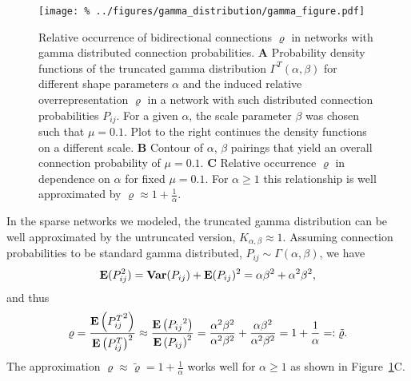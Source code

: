 \begin{figure}[h!]
\centering
\texttt{[image: \%
  ../figures/gamma\_distribution/gamma\_figure.pdf]}
\caption{Relative occurrence of bidirectional connections $\varrho$ in
  networks with gamma distributed connection probabilities. \textbf{A}
  Probability density functions of the truncated gamma distribution
  $\Gamma^T(\alpha,\beta)$ for different shape parameters $\alpha$ and
  the induced relative overrepresentation $\varrho$ in a network with
  such distributed connection probabilities $P_{ij}$. For a given
  $\alpha$, the scale parameter $\beta$ was chosen such that $\mu =
  0.1$. Plot to the right continues the density functions on a
  different scale. \textbf{B} Contour of $\alpha$, $\beta$ pairings
  that yield an overall connection probability of $\mu =
  0.1$. \textbf{C} Relative occurrence $\varrho$ in dependence on
  $\alpha$ for fixed $\mu = 0.1$. For $\alpha \geq 1$ this
  relationship is well approximated by $\varrho \approx 1 +
  \frac{1}{\alpha}$.}
\label{fig:gd}
\end{figure}
\vspace{0.2cm}

In the sparse networks we modeled, the truncated gamma distribution
can be well approximated by the untruncated version, $K_{\alpha,
  \beta} \approx 1$. Assuming connection probabilities to be standard
gamma distributed, $P_{ij} \sim \Gamma(\alpha,\beta)$, we have
\begin{align}
  \operatorname{\mathbf{E}}(P_{ij}^2) = \operatorname{\mathbf{Var}}(P_{ij}) + \operatorname{\mathbf{E}}(P_{ij})^2 =  \alpha \beta^2 + \alpha^2 \beta^2, 
\end{align}
and thus
\begin{align}
  \varrho = \frac{\operatorname{\mathbf{E}}\left({P_{ij}^T}^2\right)}{\operatorname{\mathbf{E}}\left(P_{ij}^T\right)^2} \approx \frac{\operatorname{\mathbf{E}}\left({P_{ij}}^2\right)}{\operatorname{\mathbf{E}}\left(P_{ij}\right)^2} =  \frac{\alpha^2 \beta^2}{\alpha^2 \beta^2} + \frac{\alpha \beta^2}{\alpha^2 \beta^2} =
 1 + \frac{1}{\alpha}  =: \tilde{\varrho}.
\end{align}
The approximation $\varrho \approx \tilde{\varrho} = 1 + \frac{1}{\alpha}$ works well for
$\alpha \geq 1$ as shown in Figure~\ref{fig:gd}C.



